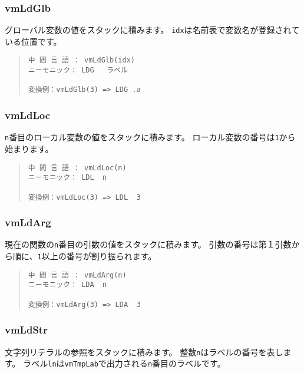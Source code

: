 \subsubsection{vmLdGlb}

グローバル変数の値をスタックに積みます。
\verb/idx/は名前表で変数名が登録されている位置です。

\begin{quote}
\begin{verbatim}
中 間 言 語 ： vmLdGlb(idx)
ニーモニック： LDG   ラベル

変換例：vmLdGlb(3) => LDG .a
\end{verbatim}
\end{quote}

\subsubsection{vmLdLoc}

\verb/n/番目のローカル変数の値をスタックに積みます。
ローカル変数の番号は\verb/1/から始まります。

\begin{quote}
\begin{verbatim}
中 間 言 語 ： vmLdLoc(n)
ニーモニック： LDL  n   

変換例：vmLdLoc(3) => LDL  3
\end{verbatim}
\end{quote}

\subsubsection{vmLdArg}

現在の関数の\verb/n/番目の引数の値をスタックに積みます。
引数の番号は第１引数から順に、\verb/1/以上の番号が割り振られます。

\begin{quote}
\begin{verbatim}
中 間 言 語 ： vmLdArg(n)
ニーモニック： LDA  n   

変換例：vmLdArg(3) => LDA  3
\end{verbatim}
\end{quote}

\subsubsection{vmLdStr}

文字列リテラルの参照をスタックに積みます。
整数\verb/n/はラベルの番号を表します。
ラベル\verb/ln/は\verb/vmTmpLab/で出力される\verb/n/番目のラベルです。


